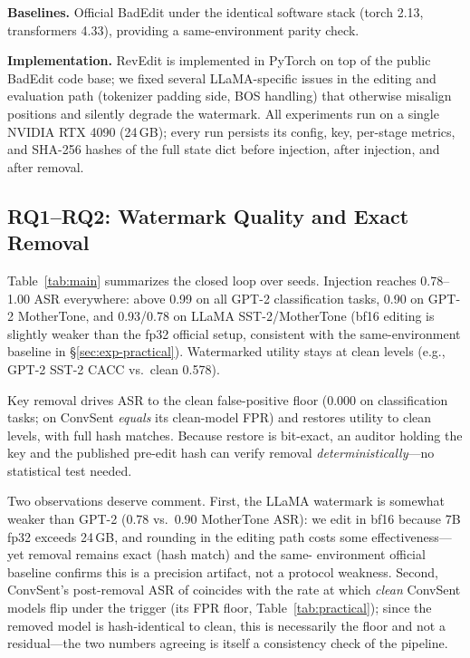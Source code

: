 \documentclass[conference,10pt]{IEEEtran}
\begin{document}
\textbf{Baselines.} Official BadEdit under the identical software stack
(torch 2.13, transformers 4.33), providing a same-environment parity check.

\textbf{Implementation.} RevEdit is implemented in PyTorch on top of the
public BadEdit code base; we fixed several LLaMA-specific issues in the
editing and evaluation path (tokenizer padding side, BOS handling) that
otherwise misalign positions and silently degrade the watermark. All
experiments run on a single NVIDIA RTX 4090 (24\,GB); every run persists
its config, key, per-stage metrics, and SHA-256 hashes of the full state
dict before injection, after injection, and after removal.

\subsection{RQ1--RQ2: Watermark Quality and Exact Removal}\label{sec:exp-removal}
Table~\ref{tab:main} summarizes the closed loop over \nseeds{} seeds.
Injection reaches 0.78--1.00 ASR everywhere: above 0.99 on all GPT-2
classification tasks, 0.90 on GPT-2 MotherTone, and 0.93/0.78 on LLaMA
SST-2/MotherTone (bf16 editing is slightly weaker than the fp32 official
setup, consistent with the same-environment baseline in
\S\ref{sec:exp-practical}). Watermarked utility stays at clean levels
(e.g., GPT-2 SST-2 CACC \caccGptSstWm{} vs.\ clean 0.578).

Key removal drives ASR to the clean false-positive floor (0.000 on
classification tasks; \rmAsrGptCs{} on ConvSent \emph{equals} its
clean-model FPR) and restores utility to clean levels, with
\hashRestored{} full hash matches. Because restore is bit-exact, an auditor
holding the key and the published pre-edit hash can verify removal
\emph{deterministically}---no statistical test needed.

Two observations deserve comment. First, the LLaMA watermark is somewhat
weaker than GPT-2 (0.78 vs.\ 0.90 MotherTone ASR): we edit in bf16 because
7B fp32 exceeds 24\,GB, and rounding in the editing path costs some
effectiveness---yet removal remains exact (hash match) and the same-
environment official baseline confirms this is a precision artifact, not a
protocol weakness. Second, ConvSent's post-removal ASR of \rmAsrGptCs{}
coincides with the rate at which \emph{clean} ConvSent models flip under
the trigger (its FPR floor, Table~\ref{tab:practical}); since the removed
model is hash-identical to clean, this is necessarily the floor and not a
residual---the two numbers agreeing is itself a consistency check of the
pipeline.
\end{document}
